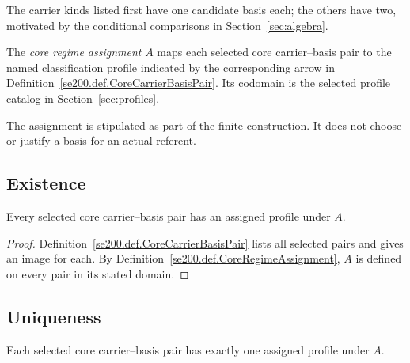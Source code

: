 The carrier kinds listed first have one candidate basis each;
the others have two, motivated by the conditional comparisons in
Section~\ref{sec:algebra}.

\begin{definition}
\label{se200.def.CoreRegimeAssignment}
The \emph{core regime assignment} $A$ maps each selected core
carrier--basis pair to the named classification profile indicated by
the corresponding arrow in Definition~\ref{se200.def.CoreCarrierBasisPair}.
Its codomain is the selected profile catalog in Section~\ref{sec:profiles}.
\end{definition}

The assignment is stipulated as part of the finite construction.
It does not choose or justify a basis for an actual referent.

\subsection{Existence}
\label{subsec:determinacy_existence}

\begin{lemma}
\label{se200.lem.CoreExistence}
Every selected core carrier--basis pair has an assigned profile under $A$.
\end{lemma}

\begin{proof}
Definition~\ref{se200.def.CoreCarrierBasisPair} lists all selected
pairs and gives an image for each.
By
Definition~\ref{se200.def.CoreRegimeAssignment}, $A$ is defined on
every pair in its stated domain.
\end{proof}

\subsection{Uniqueness}
\label{subsec:determinacy_uniqueness}

\begin{lemma}
\label{se200.lem.CoreUniqueness}
Each selected core carrier--basis pair has exactly one assigned profile
under $A$.
\end{lemma}

